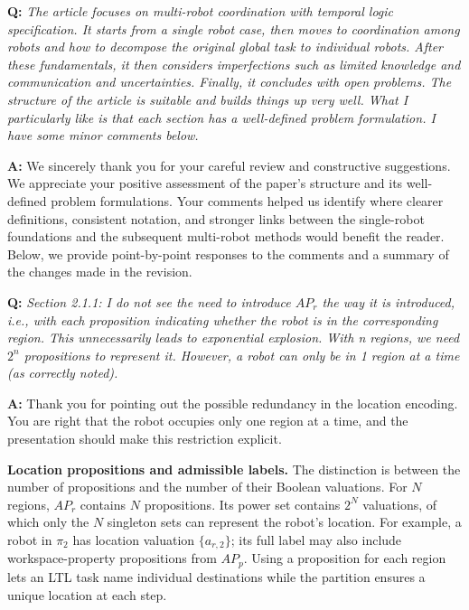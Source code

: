 \documentclass[11pt]{article}
\begin{document}
\begin{shaded*}
\noindent\textbf{Q:} \emph{The article
focuses on multi-robot coordination with temporal logic specification. It starts from a
single robot case, then moves to coordination among robots and how to decompose the
original global task to individual robots. After these fundamentals, it then considers
imperfections such as limited knowledge and communication and uncertainties. Finally, it
concludes with open problems. The structure of the article is suitable and builds things
up very well. What I particularly like is that each section has a well-defined problem
formulation. I have some minor comments below.}
\end{shaded*}
\noindent\textbf{A:} We sincerely thank you for your careful review and constructive
suggestions. We appreciate your positive assessment of the paper's structure and
its well-defined problem formulations. Your comments helped us identify where
clearer definitions, consistent notation, and stronger links between the single-robot
foundations and the subsequent multi-robot methods would benefit the reader. Below,
we provide point-by-point responses to the comments and a summary of the changes made
in the revision.

\begin{shaded*}
\noindent\textbf{Q:} \emph{Section 2.1.1: I do not see the need to
introduce $AP_r$ the way it is introduced, i.e., with each proposition indicating whether
the robot is in the corresponding region. This unnecessarily leads to exponential
explosion. With n regions, we need $2^n$ propositions to represent it. However, a robot
can only be in 1 region at a time (as correctly noted).}
\end{shaded*}
\noindent\textbf{A:} Thank you for pointing out the possible redundancy in the
location encoding. You are right that the robot occupies only one region at a
time, and the presentation should make this restriction explicit.

\textbf{Location propositions and admissible labels.} The distinction is between
the number of propositions and the number of their Boolean valuations.
For $N$ regions, $AP_r$ contains $N$ propositions. Its power set contains
$2^N$ valuations, of which only the $N$ singleton sets can represent the robot's
location. For example, a robot in $\pi_2$ has location valuation $\{a_{r,2}\}$;
its full label may also include workspace-property propositions from $AP_p$.
Using a proposition for each region lets an LTL task name individual
destinations while the partition ensures a unique location at each step.
\end{document}

